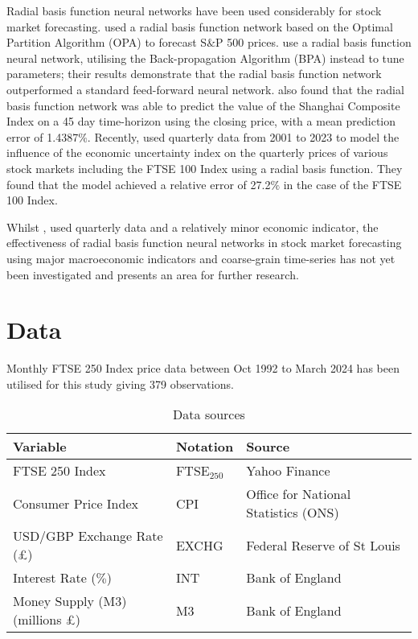 \documentclass[11pt,a4paper]{article}
\newcommand{\citeboth}[1]{\citeauthor{#1} \citep{#1}}
\begin{document}
Radial basis function neural networks have been used considerably for stock market forecasting. \citeboth{cao2004} 
used a radial basis function network based on the Optimal Partition Algorithm (OPA) to 
forecast S$\&$P 500 prices. \citeboth{dass2019} use a radial basis function neural network, utilising the Back-propagation 
Algorithm (BPA) instead to tune parameters; their results demonstrate 
that the radial basis function network outperformed a standard feed-forward neural network. 
\citeboth{ji2014} also found that the radial basis function network was able to predict the value 
of the Shanghai Composite Index on a 45 day time-horizon using the closing price, with a mean prediction error of 
1.4387$\%$. Recently, \citeboth{abotaleb2024}
used quarterly data from 2001 to 2023 to model the influence of the economic 
uncertainty index on the quarterly prices of various stock markets including the 
FTSE 100 Index using a radial basis function. They found that the model 
achieved a relative error of 27.2$\%$ in the case of the FTSE 100 Index.

Whilst \citeboth{abotaleb2024}, used quarterly data and a relatively minor economic indicator, the effectiveness of radial basis function neural networks in stock market forecasting using 
major macroeconomic indicators and coarse-grain time-series has not yet been investigated and presents an area for further 
research. 

\section{Data}

Monthly FTSE 250 Index price data between Oct 1992 to March 2024 has been utilised for this study giving 379 observations.


\begin{table}[h!]
    \centering
    \caption{Data sources}
    \begin{tabular}{lll}
        \toprule
        \textbf{Variable} & \textbf{Notation} & \textbf{Source} \\
        \midrule
        FTSE 250 Index & FTSE$_{250}$ & Yahoo Finance \\
        Consumer Price Index & CPI & Office for National Statistics (ONS) \\
        USD/GBP Exchange Rate (£) & EXCHG & Federal Reserve of St Louis \\
        Interest Rate ($\%$) & INT & Bank of England \\
        Money Supply (M3) (millions £) & M3 & Bank of England \\
        \bottomrule
    \end{tabular}
\end{table}
\end{document}
